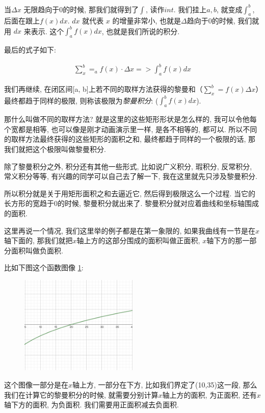 当$\Delta x$ 无限趋向于0的时候, 那我们就得到了$\int$, 读作$\mathord{int}$. 我们挂上$a,b$, 就变成$\int_a^b$, 后面在跟上$f(x)dx$. $dx$ 就代表 $x$ 的增量非常小, 也就是$\Delta$趋向于0的时候, 我们就用 $dx$ 来表示. 这个$\int_a^b f(x)dx$, 也就是我们所说的积分. 

最后的式子如下:

\begin{align*}
  \sum_x^b = _a f(x) \cdot \Delta x => \int_a^b f(x)dx
\end{align*}

我们再继续, 在闭区间[a, b]上若不同的取样方法获得的黎曼和（$\sum_x^b = f(x)\Delta x$）最终都趋于同样的极限, 则称该极限为\textit{黎曼积分}: ($\int _a^b f(x)dx$). 

那什么叫做不同的取样方法? 就是这里的这些矩形形状是怎么样的, 我可以令他每个宽都是相等, 也可以像是刚才动画演示里一样, 是各不相等的, 都可以. 所以不同的取样方法最终获得的这些矩形的面积之和, 最终都趋于同样的一个极限的话, 那我们就把这个极限叫做黎曼积分. 

除了黎曼积分之外, 积分还有其他一些形式, 比如说广义积分, 瑕积分, 反常积分, 常义积分等等, 有兴趣的同学可以自己去了解一下, 我在这里就先只涉及黎曼积分. 

所以积分就是关于用矩形面积之和去逼近它, 然后得到极限这么一个过程. 当它的长方形的宽趋于0的时候, 黎曼积分就出来了. 黎曼积分就对应着曲线和坐标轴围成的面积. 

这里再说一个情况, 我们这里举的例子都是在第一象限的, 如果我曲线有一节是在$x$轴下面的, 那我们就把$x$轴上方的这部分围成的面积叫做正面积, $x$轴下方的那一部分面积叫做负面积.  

比如下图这个函数图像 \ref{fig:img13_12}:

\begin{figure}[ht]
  \centering
  \includegraphics[width=0.5\textwidth]{asset/20230903195333.png}
  \caption{}
  \label{fig:img13_12}
\end{figure}

这个图像一部分是在$x$轴上方, 一部分在下方, 比如我们界定了(10,35)这一段, 那么我们在计算它的黎曼积分的时候, 就需要分别计算$x$轴上方的面积, 为正面积, 还有$x$轴下方的面积, 为负面积. 我们需要用正面积减去负面积. 


